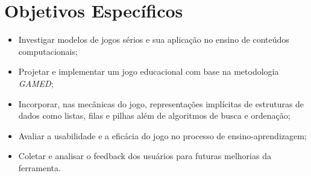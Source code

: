 \section{Objetivos Específicos}

\begin{itemize}
  \item Investigar modelos de jogos sérios e sua aplicação no ensino de conteúdos computacionais;
  \item Projetar e implementar um jogo educacional com base na metodologia \emph{GAMED};
  \item Incorporar, nas mecânicas do jogo, representações implícitas de estruturas de dados como listas, filas e pilhas além de algoritmos de busca e ordenação;
  \item Avaliar a usabilidade e a eficácia do jogo no processo de ensino-aprendizagem;
  \item Coletar e analisar o feedback dos usuários para futuras melhorias da ferramenta.
\end{itemize}

